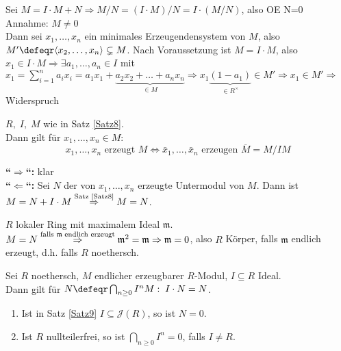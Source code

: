 \begin{Bew}
  Sei $M=I \cdot M + N \Rightarrow M/N = (I \cdot M)/N = I \cdot (M/N)$, also O\!\!E N=0\\
  Annahme: $M \not= 0$\\
  Dann sei $x_1, \dots, x_n$ ein minimales Erzeugendensystem von $M$, also $M' \defeqr \langle x_2, \dots, x_n\rangle \subsetneq M$.
  Nach Voraussetzung ist $M = I \cdot M$, also $x_1 \in I \cdot M \Rightarrow \exists a_1, \dots, a_n \in I$ mit $x_1 = \sum_{i=1}^n a_i x_i = a_1 x_1 + \underset{\in M}{\underbrace{a_2 x_2 + \dots + a_n x_n}} \Rightarrow x_1\underset{\in R^{\times}}{\underbrace{(1-a_1)}} \in M' \Rightarrow x_1 \in M' \Rightarrow$ Widerspruch
\end{Bew}

\begin{Folg}
\label{2.21}
  $R, \; I, \; M$ wie in Satz  \ref{Satz8}.\\
  Dann gilt für $x_1, \dots, x_n \in M$:
  \[ x_1, \dots, x_n \text{ erzeugt } M \Leftrightarrow \bar{x}_1, \dots, \bar{x}_n \text{ erzeugen } \overline{M} = M/IM\]
\end{Folg}

\begin{Bew}
  \textbf{``$\Rightarrow$``:} klar\\
  \textbf{``$\Leftarrow$``:} Sei $N$ der von $x_1, \dots, x_n$ erzeugte Untermodul von $M$. Dann ist $M = N + I \cdot M \overset{\text{\scriptsize Satz \ref{Satz8}}}{\Rightarrow} M = N$.
\end{Bew}

\begin{nnBsp}
  $R$ lokaler Ring mit maximalem Ideal $\mathfrak{m}$.\\
  $M = N \overset{\text{\scriptsize falls }\mathfrak{m} \; \text{\scriptsize endlich erzeugt}}{\Rightarrow} \mathfrak{m}^2 = \mathfrak{m} \Rightarrow \mathfrak{m} = 0$, also $R$ Körper, falls $\mathfrak{m}$ endlich erzeugt, d.h. falls $R$ noethersch.
\end{nnBsp}

\begin{Satz}
\label{Satz9}
  Sei $R$ noethersch, $M$ endlicher erzeugbarer $R$-Modul, $I \subseteq R$ Ideal.\\
  Dann gilt für $N \defeqr \bigcap_{n \geq 0} I^n M: \; I \cdot N = N$.
\end{Satz}

\begin{Folg}
\label{2.22}
  \begin{enumerate}
    \item \label{2.22a} Ist in Satz \ref{Satz9} $I \subseteq \mathcal{J}(R)$, so ist $N = 0$.
    \item Ist $R$ nullteilerfrei, so ist $\bigcap_{n \geq 0} I^n = 0$, falls $I \neq R$.
  \end{enumerate}
\end{Folg}

